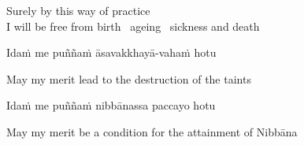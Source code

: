 \begin{english}
  Surely by this way of practice\\
  I will be free from birth \breathmark\ ageing \breathmark\ sickness and death
\end{english}

\ifasixversion\clearpage\fi

Idaṁ me puññaṁ āsavakkhayā-vahaṁ hotu

\begin{english}
  May my merit lead to the destruction of the taints
\end{english}

Idaṁ me puññaṁ nibbānassa paccayo hotu

\begin{english}
  May my merit be a condition for the attainment of Nibbāna
\end{english}



\endgroup

